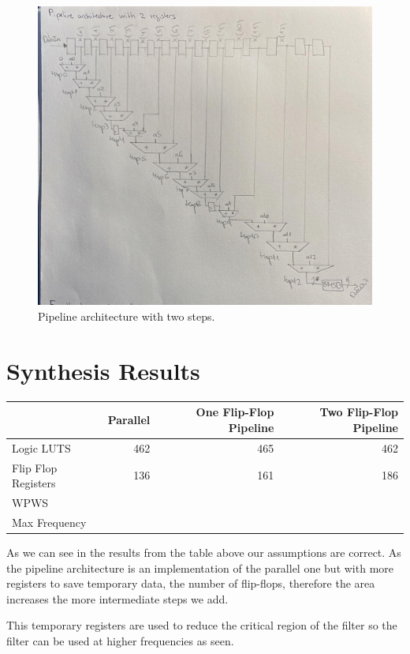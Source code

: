 \documentclass[a4paper, 12pt]{article}
\begin{document}
\begin{figure}[htbp]
\centering
\includegraphics[width=.9\linewidth]{./img/architecture_pipeline.jpg}
\caption{Pipeline architecture with two steps.}
\end{figure}
\section{Synthesis Results}
\label{sec:org114d16c}

\begin{center}
\begin{tabular}{lrrr}
 & Parallel & One Flip-Flop Pipeline & Two Flip-Flop Pipeline\\
\hline
Logic LUTS & 462 & 465 & 462\\
Flip Flop Registers & 136 & 161 & 186\\
WPWS &  &  & \\
Max Frequency &  &  & \\
\end{tabular}
\end{center}

As we can see in the results from the table above our assumptions are correct. As the pipeline architecture is an implementation of the parallel one but with more registers to save temporary data, the number of flip-flops, therefore the area increases the more intermediate steps we add.

This temporary registers are used to reduce the critical region of the filter so the filter can be used at higher frequencies as seen.
\end{document}
